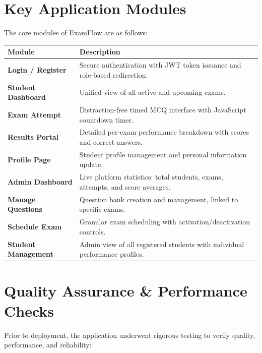 \documentclass[12pt,a4paper]{article}
\begin{document}
\section{Key Application Modules}

The core modules of ExamFlow are as follows:

\begin{center}
\begin{tabular}{>{\bfseries}p{4.5cm} p{9cm}}
  \toprule
  Module & Description \\
  \midrule
  Login / Register      & Secure authentication with JWT token issuance and role-based redirection. \\
  Student Dashboard     & Unified view of all active and upcoming exams. \\
  Exam Attempt          & Distraction-free timed MCQ interface with JavaScript countdown timer. \\
  Results Portal        & Detailed per-exam performance breakdown with scores and correct answers. \\
  Profile Page          & Student profile management and personal information update. \\
  Admin Dashboard       & Live platform statistics: total students, exams, attempts, and score averages. \\
  Manage Questions      & Question bank creation and management, linked to specific exams. \\
  Schedule Exam         & Granular exam scheduling with activation/deactivation controls. \\
  Student Management    & Admin view of all registered students with individual performance profiles. \\
  \bottomrule
\end{tabular}
\end{center}

\section{Quality Assurance \& Performance Checks}

Prior to deployment, the application underwent rigorous testing to verify quality, performance, and reliability:
\end{document}
